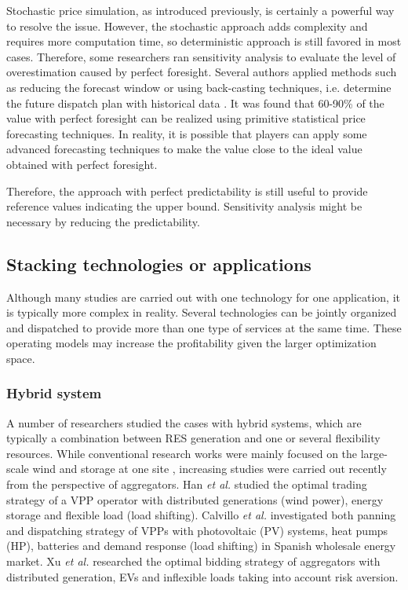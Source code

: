 Stochastic price simulation, as introduced previously, is certainly a powerful way to resolve the issue. However, the stochastic approach adds complexity and requires more computation time, so deterministic approach is still favored in most cases. Therefore, some researchers ran sensitivity analysis to evaluate the level of overestimation caused by perfect foresight. Several authors applied methods such as reducing the forecast window \cite{Connolly2011} or using back-casting techniques, i.e. determine the future dispatch plan with historical data \cite{Sioshansi2009,Drury2011,Bathurst2003}. It was found that 60-90\% of the value with perfect foresight can be realized using primitive statistical price forecasting techniques. In reality, it is possible that players can apply some advanced forecasting techniques to make the value close to the ideal value obtained with perfect foresight. 

Therefore, the approach with perfect predictability is still useful to provide reference values indicating the upper bound. Sensitivity analysis might be necessary by reducing the predictability.

\subsection{Stacking technologies or applications}
\label{sec:lit-stacking}
Although many studies are carried out with one technology for one application, it is typically more complex in reality. Several technologies can be jointly organized and  dispatched to provide more than one type of services at the same time. These operating models may increase the profitability given the larger optimization space.

\subsubsection{Hybrid system}
A number of researchers studied the cases with hybrid systems, which are typically a combination between RES generation and one or several flexibility resources. While conventional research works were mainly focused on the large-scale wind and storage at one site \cite{Bathurst2003,Denholm2009}, increasing studies were carried out recently from the perspective of aggregators. Han \textit{et al.} \cite{Han2017} studied the optimal trading strategy of a VPP operator with distributed generations (wind power), energy storage and flexible load (load shifting). 
Calvillo \textit{et al.} \cite{Calvillo2016} investigated both panning and dispatching strategy of VPPs with photovoltaic (PV) systems, heat pumps (HP), batteries and demand response (load shifting) in Spanish wholesale energy market. Xu \textit{et al.} \cite{Xu2017} researched the optimal bidding strategy of aggregators with distributed generation, EVs and inflexible loads taking into account risk aversion. 

